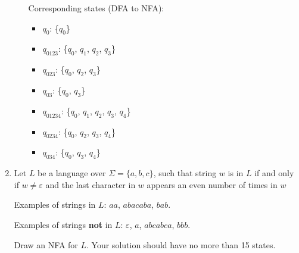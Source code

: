 \documentclass[11pt]{article}
\renewcommand{\epsilon}{\varepsilon}
\begin{document}
\begin{enumerate}
\begin{enumerate}
    Corresponding states (DFA to NFA):
    \begin{itemize}
        \item $q_0$: \{{$q_0$}\}
        \item $q_{0123}$: \{{$q_0$, $q_1$, $q_2$, $q_3$}\}
        \item $q_{023}$: \{{$q_0$, $q_2$, $q_3$}\}
        \item $q_{03}$: \{{$q_0$, $q_3$}\}
        \item $q_{01234}$: \{{$q_0$, $q_1$, $q_2$, $q_3$, $q_4$}\}
        \item $q_{0234}$: \{{$q_0$, $q_2$, $q_3$, $q_4$}\}
        \item $q_{034}$: \{{$q_0$, $q_3$, $q_4$}\}
    \end{itemize}
\end{enumerate}

\newpage

\item Let $L$ be a language over $\Sigma = \{a, b, c\}$, such that string $w$ is in $L$ if and only if $w\neq\epsilon$ and the last character in $w$ appears an even number of times in $w$

Examples of strings in $L$: $aa$, $abacaba$, $bab$.

Examples of strings \textbf{not} in $L$: $\epsilon$, $a$, $abcabca$, $bbb$.

Draw an NFA for $L$.  Your solution should have no more than 15 states.


\end{enumerate}
\end{document}

